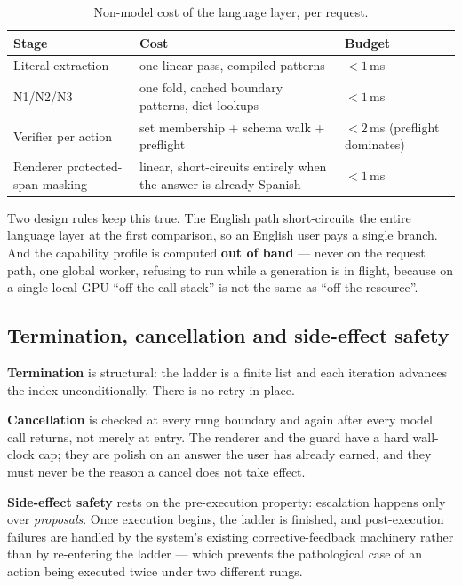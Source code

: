 \begin{table}[htbp]
\centering
\small
\caption{Non-model cost of the language layer, per request.}
\label{tab:nepantla-cost}
\begin{tabular}{@{}>{\raggedright\arraybackslash}p{}
                  >{\raggedright\arraybackslash}p{}
                  >{\raggedright\arraybackslash}p{}@{}}
\toprule
\textbf{Stage} & \textbf{Cost} & \textbf{Budget} \\
\midrule
Literal extraction & one linear pass, compiled patterns & $<1$\,ms \\
N1/N2/N3 & one fold, cached boundary patterns, dict lookups & $<1$\,ms \\
Verifier per action & set membership + schema walk + preflight &
  $<2$\,ms (preflight dominates) \\
Renderer protected-span masking & linear, short-circuits entirely when the
  answer is already Spanish & $<1$\,ms \\
\bottomrule
\end{tabular}
\end{table}

Two design rules keep this true. The English path short-circuits the entire
language layer at the first comparison, so an English user pays a single branch.
And the capability profile is computed \textbf{out of band} --- never on the
request path, one global worker, refusing to run while a generation is in
flight, because on a single local GPU ``off the call stack'' is not the same as
``off the resource''.

\subsection{Termination, cancellation and side-effect safety}
\label{sec:termination-cancellation}

\textbf{Termination} is structural: the ladder is a finite list and each
iteration advances the index unconditionally. There is no retry-in-place.

\textbf{Cancellation} is checked at every rung boundary and again after every
model call returns, not merely at entry. The renderer and the guard have a hard
wall-clock cap; they are polish on an answer the user has already earned, and
they must never be the reason a cancel does not take effect.

\textbf{Side-effect safety} rests on the pre-execution property: escalation
happens only over \emph{proposals}. Once execution begins, the ladder is
finished, and post-execution failures are handled by the system's existing
corrective-feedback machinery rather than by re-entering the ladder --- which
prevents the pathological case of an action being executed twice under two
different rungs.

